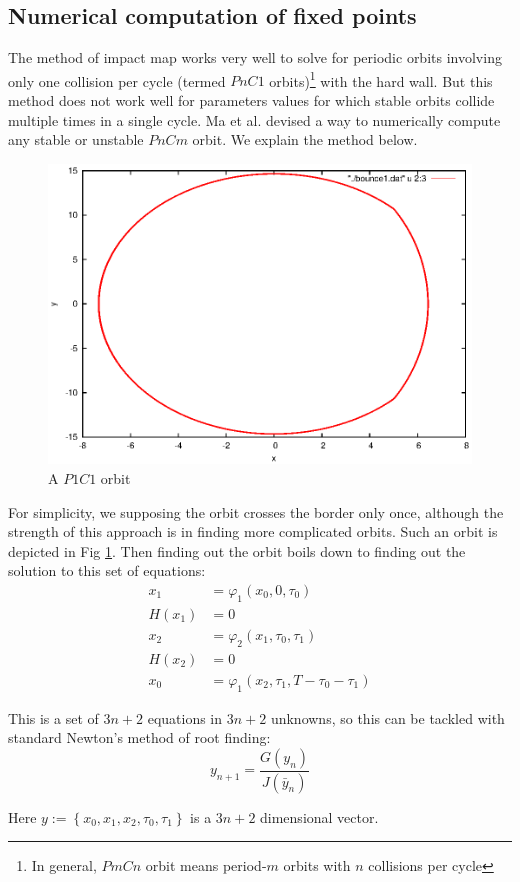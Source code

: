\documentclass{book}
\renewcommand{\(}{\begin{columns}}
\renewcommand{\)}{\end{columns}}
\newcommand{\<}[1]{\begin{column}{#1}}
\renewcommand{\>}{\end{column}}
\begin{document}
\subsection{Numerical computation of fixed points}
\label{subsec-num-comp}
The method of impact map works very well to solve for periodic orbits 
involving only one collision per cycle (termed $PnC1$ orbits)\footnote{In 
general, $PmCn$ orbit means period-$m$ orbits with $n$ collisions per cycle} with the hard wall.  But this method does not 
work well for parameters values for which stable orbits collide multiple times 
in a single cycle. Ma et al.\cite{ma-nraphson} devised a way to 
numerically compute any stable or unstable $PnCm$ orbit.  We explain the 
method below. 

\begin{figure}
\caption{A $P1C1$ orbit}
\label{fig-p1c1}
\begin{center}
\includegraphics[width=0.5\columnwidth]{p1c1}
\end{center}
\end{figure}

For simplicity, we supposing the orbit crosses the border only once, although 
the strength of this approach is in finding more complicated orbits.  Such an 
orbit is depicted in Fig \ref{fig-p1c1}.
Then finding out the orbit boils down to finding out the solution to this set 
of equations:
\begin{align}
x_1&=\varphi_1(x_0,0,\tau_0)\\
H(x_1)&=0\\
x_2&=\varphi_2(x_1,\tau_0,\tau_1)\\
H(x_2)&=0\\
x_0&=\varphi_1(x_2,\tau_1,T-\tau_0-\tau_1)
\end{align}


This is a set of $3n+2$ equations in $3n+2$ unknowns, so this can be tackled 
with standard Newton's method of root finding:
\[
y_{n+1}=\frac{G(y_n)}{J(\bar{y}_n)}
\]

Here $y:=\left\{x_0,x_1,x_2,\tau_0,\tau_1\right\}$ is a $3n+2$ dimensional 
vector.  
\end{document}
